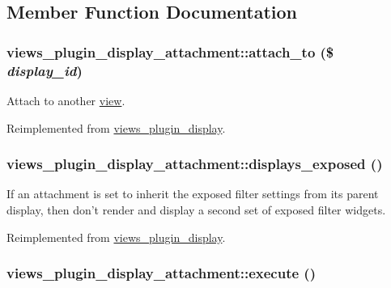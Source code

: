 \subsection{Member Function Documentation}
\hypertarget{classviews__plugin__display__attachment_e8fcfc681cc9ff841ac5c0bdf1691b31}{
\subsubsection[{attach\_\-to}]{\setlength{\rightskip}{0pt plus 5cm}views\_\-plugin\_\-display\_\-attachment::attach\_\-to (\$ {\em display\_\-id})}}
\label{classviews__plugin__display__attachment_e8fcfc681cc9ff841ac5c0bdf1691b31}


Attach to another \hyperlink{classview}{view}. 

Reimplemented from \hyperlink{classviews__plugin__display_a74683048bca4e740cb7e25ae4c527d4}{views\_\-plugin\_\-display}.\hypertarget{classviews__plugin__display__attachment_a047b05c7d1e48bd2ec6c98a27720ebf}{
\subsubsection[{displays\_\-exposed}]{\setlength{\rightskip}{0pt plus 5cm}views\_\-plugin\_\-display\_\-attachment::displays\_\-exposed ()}}
\label{classviews__plugin__display__attachment_a047b05c7d1e48bd2ec6c98a27720ebf}


If an attachment is set to inherit the exposed filter settings from its parent display, then don't render and display a second set of exposed filter widgets. 

Reimplemented from \hyperlink{classviews__plugin__display_47058532874d0bc5448b53e0a98489cc}{views\_\-plugin\_\-display}.\hypertarget{classviews__plugin__display__attachment_5ca7a4fec7907cd236d0f73ac21f4e1e}{
\subsubsection[{execute}]{\setlength{\rightskip}{0pt plus 5cm}views\_\-plugin\_\-display\_\-attachment::execute ()}}
\label{classviews__plugin__display__attachment_5ca7a4fec7907cd236d0f73ac21f4e1e}


